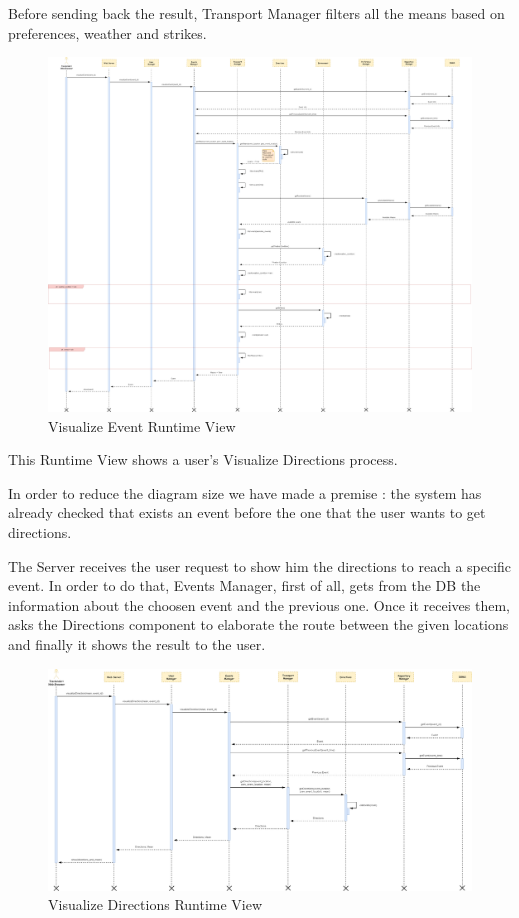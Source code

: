 Before sending back the result, Transport Manager filters all the means based on preferences, weather and strikes.
\begin{figure}[H]
	\centering
	\includegraphics[scale=0.125]{Images/Runtime/Visualize_Event}
	\caption{Visualize Event Runtime View}
\end{figure}

This Runtime View shows a user's Visualize Directions process.\par
In order to reduce the diagram size we have made a premise : the system has already checked that exists an event before the one that the user wants to get directions.\par
The Server receives the user request to show him the directions to reach a specific event. In order to do that, Events Manager, first of all, gets from the DB the information about the choosen event and the previous one. Once it receives them, asks the Directions component to elaborate the route between the given locations and finally it shows the result to the user.
\begin{figure}[H]
	\centering
	\includegraphics[scale=0.16]{Images/Runtime/Visualize_Directions}
	\caption{Visualize Directions Runtime View}
\end{figure}

